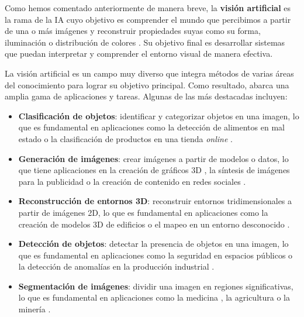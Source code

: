 Como hemos comentado anteriormente de manera breve, la \textbf{visión artificial}
es la rama de la IA cuyo objetivo es comprender el mundo que percibimos a partir
de una o más imágenes y reconstruir propiedades suyas como su forma, iluminación
o distribución de colores \cite{szeliski2022computer}. Su objetivo final es desarrollar
sistemas que puedan interpretar y comprender el entorno visual de manera efectiva.

La visión artificial es un campo muy diverso que integra métodos de varias áreas
del conocimiento para lograr su objetivo principal. Como resultado, abarca una amplia
gama de aplicaciones y tareas. Algunas de las más destacadas incluyen:

\begin{itemize}
	\item \textbf{Clasificación de objetos}: identificar y categorizar objetos en una
	imagen, lo que es fundamental en aplicaciones como la detección de alimentos
	en mal estado \cite{hossain2018automatic} o la clasificación de productos en
	una tienda \textit{online} \cite{kannan2011improving}.
	
	\item \textbf{Generación de imágenes}: crear imágenes a partir de modelos o datos,
	lo que tiene aplicaciones en la creación de gráficos 3D
	\cite{li2023neuralangelohighfidelityneuralsurface}, la síntesis de imágenes para
	la publicidad \cite{6777138} o la creación de contenido en redes sociales \cite{coary2016consumer}.
	
	\item \textbf{Reconstrucción de entornos 3D}: reconstruir entornos tridimensionales
	a partir de imágenes 2D, lo que es fundamental en aplicaciones como la
	creación de modelos 3D de edificios \cite{lewis1998generation} o el mapeo en
	un entorno desconocido \cite{snavely2011scene}.
	
	\item \textbf{Detección de objetos}: detectar la presencia de objetos en una imagen,
	lo que es fundamental en aplicaciones como la seguridad en espacios públicos
	\cite{perez2020object} o la detección de anomalías en la producción
	industrial \cite{tina_dasci_arcelor}.
	
	\item \textbf{Segmentación de imágenes}: dividir una imagen en regiones significativas,
	lo que es fundamental en aplicaciones como la medicina \cite{Havaei_2017}, la
	agricultura \cite{chiu2020agriculture} o la minería \cite{thurley2013automated}.
\end{itemize}

